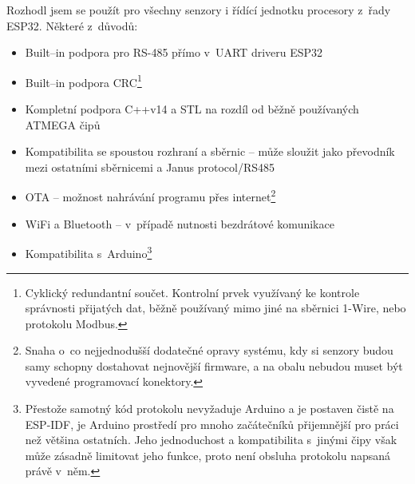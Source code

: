 Rozhodl jsem se použít pro všechny senzory i řídící jednotku procesory z~řady ESP32.
Některé z~důvodů:
\begin{itemize}
    \item Built--in podpora pro RS-485 přímo v~UART driveru ESP32
    \item Built--in podpora CRC\footnote{Cyklický redundantní součet. Kontrolní prvek využívaný ke kontrole správnosti přijatých dat, běžně používaný mimo jiné na sběrnici 1-Wire, nebo protokolu Modbus.}
    \item Kompletní podpora C++v14 a STL na rozdíl od běžně používaných ATMEGA čipů
    \item Kompatibilita se spoustou rozhraní a sběrnic -- může sloužit jako převodník mezi ostatními sběrnicemi a Janus protocol/RS485
    \item OTA -- možnost nahrávání programu přes internet\footnote{Snaha o~co nejjednodušší dodatečné opravy systému, kdy si senzory budou samy schopny dostahovat nejnovější firmware, a na obalu nebudou muset být vyvedené programovací konektory.}
    \item WiFi a Bluetooth -- v~případě nutnosti bezdrátové komunikace
    \item Kompatibilita s~Arduino\footnote{Přestože samotný kód protokolu nevyžaduje Arduino a je postaven čistě na ESP-IDF, je Arduino prostředí pro mnoho začátečníků přijemnější pro práci než většina ostatních. Jeho jednoduchost a kompatibilita s~jinými čipy však může zásadně limitovat jeho funkce, proto není obsluha protokolu napsaná právě v~něm.}
\end{itemize}